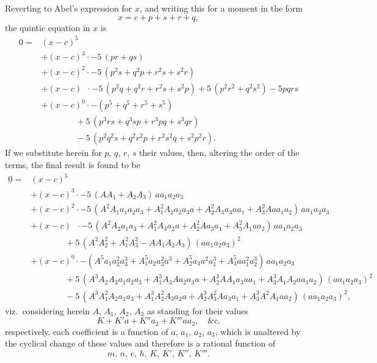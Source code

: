 \documentclass[11pt]{article}
\begin{document}
Reverting to Abel's expression for $x$, and writing this for a moment in the
form
\[
   x = c + p + s + r + q,
\]
the quintic equation in $x$ is
\begin{align*}
   0 ={}& (x - c)^5\\
        & + (x - c)^3 \cdot - 5\,(pr + qs)\\
        & + (x - c)^2 \cdot - 5\,(p^2 s + q^2 p + r^2 s + s^2 r)\\
        & + (x - c)\;\;\cdot - 5\,(p^2 q + q^2 r + r^2 s + s^2 p) + 5\,(p^2 r^2 + q^2 s^2) - 5 pqrs\\
        & + (x - c)^0 \cdot - (p^5 + q^5 + r^5 + s^5)\\
        & \qquad\qquad + 5\,(p^3 rs + q^3 sp + r^3 pq + s^3 qr)\\
        & \qquad\qquad - 5\,(p^2 q^2 s + q^2 r^2 p + r^2 s^2 q + s^2 p^2 r).
\end{align*}
If we substitute herein for $p$, $q$, $r$, $s$ their values, then, altering the order of the
terms, the final result is found to be
\begin{align*}
   0 ={}& (x - c)^5\\
        & + (x - c)^3 \cdot - 5\,(A A_1 + A_2 A_3)\,a a_1 a_2 a_3\\
        & + (x - c)^2 \cdot - 5\,(A^2 A_1 a_1 a_2 a_3 + A_1^2 A_2 a_2 a_3 a + A_2^2 A_3 a_3 a a_1 + A_3^2 A a a_1 a_2)\,a a_1 a_2 a_3\\
        & + (x - c)\;\;\cdot - 5\,(A^2 A_2 a_1 a_3 + A_1^2 A_3 a_2 a + A_2^2 A a_3 a_1 + A_3^2 A_1 a a_2)\,a a_1 a_2 a_3\\
        & \qquad\qquad + 5\,(A^2 A_2^2 + A_1^2 A_3^2 - A A_1 A_2 A_3)\,(a a_1 a_2 a_3)^2\\
        & + (x - c)^0 \cdot - (A^5 a_1 a_2^2 a_3^3 + A_1^5 a_2 a_3^2 a^3 + A_2^5 a_3 a^2 a_1^3 + A_3^5 a a_1^2 a_2^3)\,a a_1 a_2 a_3\\
        & \qquad\qquad + 5\,(A^3 A_2 A_3 a_1 a_2 a_3 + A_1^3 A_3 A a_2 a_3 a + A_2^3 A A_1 a_3 a a_1 + A_3^3 A_1 A_2 a a_1 a_2)\,(a a_1 a_2 a_3)^2\\
        & \qquad\qquad - 5\,(A^3 A_1^2 A_2 a_1 a_3 + A_1^3 A_2^2 A_3 a_2 a + A_2^3 A_3^2 A a_3 a_1 + A_3^3 A^2 A_1 a a_2)\,(a a_1 a_2 a_3)^2,
\end{align*}
viz.\ considering herein $A$, $A_1$, $A_2$, $A_3$ as standing for their values
\[
   K + K'a + K''a_2 + K'''a a_2,\quad \&\text{c.}
\]
respectively, each coefficient is a function of $a$, $a_1$, $a_2$, $a_3$, which is unaltered by the
cyclical change of these values and therefore is a rational function of
\[
   m,\, n,\, e,\, h,\, K,\, K',\, K'',\, K'''.
\]
\end{document}
